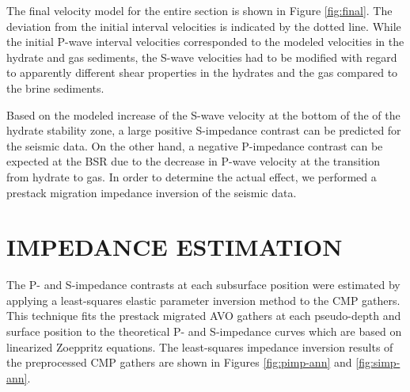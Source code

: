 
The final velocity model for the entire section is shown in Figure
\ref{fig:final}. The deviation from the initial interval velocities is indicated
by the dotted line. While the initial P-wave interval velocities corresponded
to the modeled velocities in the hydrate and gas sediments,
the S-wave velocities
had to be modified with regard to apparently different shear properties in the
hydrates and the gas compared to the brine sediments.
\par
Based on the modeled increase of the S-wave velocity at the bottom of the
of the hydrate stability zone, a large positive S-impedance contrast can be
predicted for the seismic data. On the other hand, a negative P-impedance
contrast can be expected at the BSR due to the decrease in P-wave velocity
at the transition from hydrate to gas. In order to determine the actual effect,
we performed a prestack migration impedance inversion of the seismic data.

\notinteractive
{}



\section{IMPEDANCE ESTIMATION}

The P- and S-impedance contrasts at each subsurface position were estimated 
by applying a least-squares elastic parameter inversion method 
\cite[]{lumley.sep.70.165,lumley.sep.77.211} to the CMP gathers. This technique
fits the prestack migrated AVO gathers at each pseudo-depth and surface 
position to the theoretical P- and S-impedance curves which are based on
linearized Zoeppritz equations. The least-squares impedance inversion results
of the preprocessed CMP gathers are shown in Figures \ref{fig:pimp-ann} and 
\ref{fig:simp-ann}.




